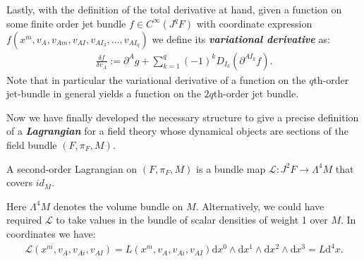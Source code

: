 Lastly, with the definition of the total derivative at hand, given a function on some finite order jet bundle $f \in C^{\infty}(J^qF)$ with coordinate expression $f(x^m,v_A,v_{Am},v_{AI},v_{AI_{3}},...,v_{AI_{q}})$ we define its \textit{\textbf{variational derivative}} as: 
\begin{align}\label{varDer}
\frac{\delta f}{\delta v_A} := \partial^{A}g + \sum _{k = 1}^q (-1)^k D_{I_k}(\partial^{AI_k}f).
\end{align}
Note that in particular the variational derivative of a function on the $q$th-order jet-bundle in general yields a function on the $2q$th-order jet bundle.

Now we have finally developed the necessary structure to give a precise definition of a \textbf{\textit{Lagrangian}} for a field theory whose dynamical objects are sections of the field bundle $(F, \pi_F,M)$.
\begin{definition}[Lagrangian]
A second-order Lagrangian on $(F,\pi_F,M)$ is a bundle map $\mathcal{L} : J^2F \rightarrow \Lambda^4M$ that covers $id_M$.
\end{definition}
Here $\Lambda^4 M$ denotes the volume bundle on $M$. Alternatively, we could have required $\mathcal{L}$ to take values in the bundle of scalar densities of weight 1 over $M$. In coordinates we have: 
\begin{align}
    \mathcal{L}(x^m,v_A,v_{Ai},v_{AI}) = L(x^m,v_A,v_{Ai},v_{AI}) \mathrm{d}x^0 \wedge \mathrm{d}x^1 \wedge \mathrm{d}x^2 \wedge \mathrm{d}x^3 = L \mathrm{d}^4x.
\end{align} 


